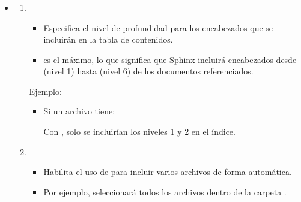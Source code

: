 \documentclass[a4paper,10pt,spanish]{sphinxmanual}
\begin{document}
\begin{itemize}
\begin{itemize}
\begin{itemize}
\item {} \subsubsection*{}
\begin{enumerate}
%
\item {} 
\sphinxAtStartPar
{}
\begin{itemize}
\item {} 
\sphinxAtStartPar
Especifica el nivel de profundidad para los encabezados que se incluirán en la tabla de contenidos.

\item {} 
\sphinxAtStartPar
{} es el máximo, lo que significa que Sphinx incluirá encabezados desde \sphinxcode{\sphinxupquote{\#}} (nivel 1) hasta \sphinxcode{\sphinxupquote{\#\#\#\#\#\#}} (nivel 6) de los documentos referenciados.

\end{itemize}

\sphinxAtStartPar
Ejemplo:
\begin{itemize}
\item {} 
\sphinxAtStartPar
Si un archivo tiene:

\begin{sphinxVerbatim}[commandchars=\\\{\}]
\end{sphinxVerbatim}

\sphinxAtStartPar
Con , solo se incluirían los niveles 1 y 2 en el índice.

\end{itemize}

\item {} 
\sphinxAtStartPar
{}
\begin{itemize}
\item {} 
\sphinxAtStartPar
Habilita el uso de  para incluir varios archivos de forma automática.

\item {} 
\sphinxAtStartPar
Por ejemplo,  seleccionará todos los archivos dentro de la carpeta .


\end{itemize}
\end{enumerate}
\end{itemize}
\end{itemize}
\end{itemize}
\end{document}
